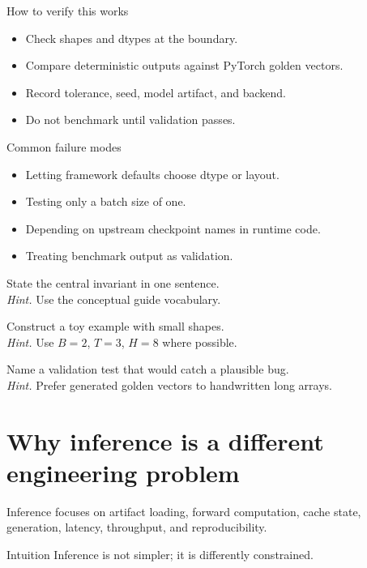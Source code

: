 \begin{verificationbox}{How to verify this works}
\begin{itemize}
\item Check shapes and dtypes at the boundary.
\item Compare deterministic outputs against PyTorch golden vectors.
\item Record tolerance, seed, model artifact, and backend.
\item Do not benchmark until validation passes.
\end{itemize}
\end{verificationbox}

\begin{warningbox}{Common failure modes}
\begin{itemize}
\item Letting framework defaults choose dtype or layout.
\item Testing only a batch size of one.
\item Depending on upstream checkpoint names in runtime code.
\item Treating benchmark output as validation.
\end{itemize}
\end{warningbox}

\begin{chapterexercises}
\item State the central invariant in one sentence.\\
\textit{Hint.} Use the conceptual guide vocabulary.
\item Construct a toy example with small shapes.\\
\textit{Hint.} Use $B=2$, $T=3$, $H=8$ where possible.
\item Name a validation test that would catch a plausible bug.\\
\textit{Hint.} Prefer generated golden vectors to handwritten long arrays.
\end{chapterexercises}

\chapter{Why inference is a different engineering problem}
\label{ch:inference-different}
Inference focuses on artifact loading, forward computation, cache state, generation, latency, throughput, and reproducibility.



\begin{intuitionbox}{Intuition}
Inference is not simpler; it is differently constrained.
\end{intuitionbox}

